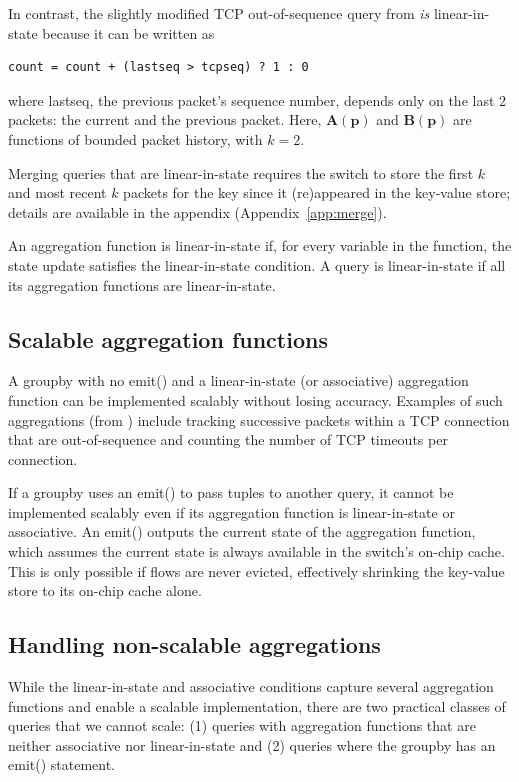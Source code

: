 In contrast, the slightly modified TCP out-of-sequence query from  {\em is}
linear-in-state because it can be written as
\begin{lstlisting}
count = count + (lastseq > tcpseq) ? 1 : 0
\end{lstlisting}
where {\ct lastseq}, the previous packet's sequence number, depends only on the last 2 packets: the current and the previous packet. Here,
$\boldsymbol{A}(\mathbf{p})$ and $\boldsymbol{B}(\mathbf{p})$ are functions of bounded packet history,
with $k = 2$.

Merging queries that are linear-in-state requires the switch to store
the first $k$ and most recent $k$ packets
for the key since it (re)appeared in the key-value store; details are
available in the appendix (Appendix~\ref{app:merge}).

An aggregation function is linear-in-state
if, for every variable in the function, the state update
satisfies the linear-in-state condition. A query is linear-in-state
if all its aggregation functions are linear-in-state.

\subsection{Scalable aggregation functions}
\label{sec:scalable}
A {\ct groupby} with no {\ct emit()} and a linear-in-state (or associative) aggregation function
can be implemented scalably without losing accuracy. Examples of such
aggregations (from ) include tracking successive
packets within a TCP connection that are out-of-sequence and counting the
number of TCP timeouts per connection.
%

 If a
{\ct groupby} uses an {\ct emit()} to pass tuples to another query, it cannot be
implemented scalably even if its aggregation function is linear-in-state or associative. An {\ct emit()} outputs the current state of the
aggregation function, which assumes the current state is always available in
the switch's on-chip cache. This is only possible if flows are never evicted,
effectively shrinking the key-value store to its on-chip cache alone.

\subsection{Handling non-scalable aggregations}
\label{sec:workaround-nonscalable}
While the linear-in-state and associative conditions capture several
aggregation functions and enable a scalable implementation, there are two
practical classes of queries that we cannot scale: (1) queries with aggregation
functions that are neither associative nor linear-in-state and (2) queries where
the groupby has an {\ct emit()} statement.

